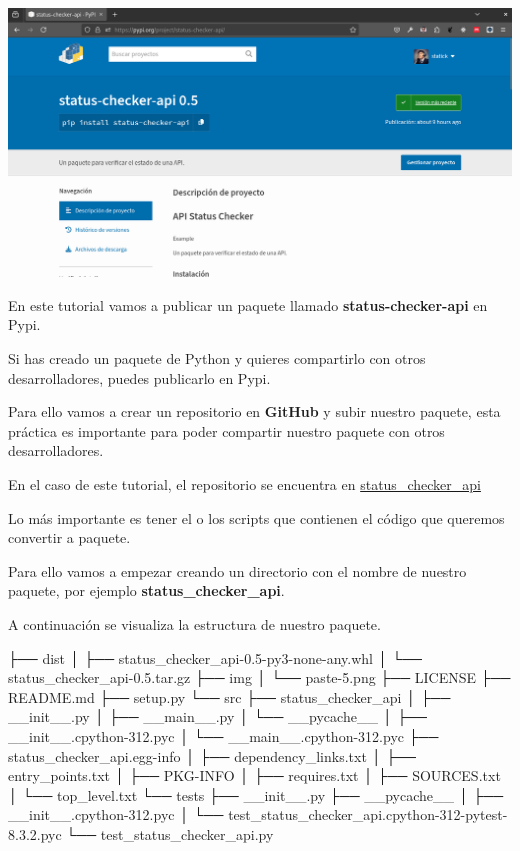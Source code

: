 \documentclass[
  a4paper,
  DIV=11,
  numbers=noendperiod,
  onepage,
  openany]{scrreprt}
\newenvironment{Shaded}{\begin{snugshade}}{\end{snugshade}}
\newcommand{\NormalTok}[1]{\textcolor[rgb]{0.00,0.23,0.31}{#1}}
\begin{document}
\begin{tcolorbox}
\includegraphics{unidades/unidad4/images/paste-10.png}

En este tutorial vamos a publicar un paquete llamado
\textbf{status-checker-api} en Pypi.

Si has creado un paquete de Python y quieres compartirlo con otros
desarrolladores, puedes publicarlo en Pypi.

Para ello vamos a crear un repositorio en \textbf{GitHub} y subir
nuestro paquete, esta práctica es importante para poder compartir
nuestro paquete con otros desarrolladores.

En el caso de este tutorial, el repositorio se encuentra en
\href{https://github.com/statick88/status_checker_api}{status\_checker\_api}

Lo más importante es tener el o los scripts que contienen el código que
queremos convertir a paquete.

Para ello vamos a empezar creando un directorio con el nombre de nuestro
paquete, por ejemplo \textbf{status\_checker\_api}.

A continuación se visualiza la estructura de nuestro paquete.

\begin{Shaded}
\begin{Highlighting}[]
\NormalTok{├── dist}
\NormalTok{│   ├── status\_checker\_api{-}0.5{-}py3{-}none{-}any.whl}
\NormalTok{│   └── status\_checker\_api{-}0.5.tar.gz}
\NormalTok{├── img}
\NormalTok{│   └── paste{-}5.png}
\NormalTok{├── LICENSE}
\NormalTok{├── README.md}
\NormalTok{├── setup.py}
\NormalTok{└── src}
\NormalTok{    ├── status\_checker\_api}
\NormalTok{    │   ├── \_\_init\_\_.py}
\NormalTok{    │   ├── \_\_main\_\_.py}
\NormalTok{    │   └── \_\_pycache\_\_}
\NormalTok{    │       ├── \_\_init\_\_.cpython{-}312.pyc}
\NormalTok{    │       └── \_\_main\_\_.cpython{-}312.pyc}
\NormalTok{    ├── status\_checker\_api.egg{-}info}
\NormalTok{    │   ├── dependency\_links.txt}
\NormalTok{    │   ├── entry\_points.txt}
\NormalTok{    │   ├── PKG{-}INFO}
\NormalTok{    │   ├── requires.txt}
\NormalTok{    │   ├── SOURCES.txt}
\NormalTok{    │   └── top\_level.txt}
\NormalTok{    └── tests}
\NormalTok{        ├── \_\_init\_\_.py}
\NormalTok{        ├── \_\_pycache\_\_}
\NormalTok{        │   ├── \_\_init\_\_.cpython{-}312.pyc}
\NormalTok{        │   └── test\_status\_checker\_api.cpython{-}312{-}pytest{-}8.3.2.pyc}
\NormalTok{        └── test\_status\_checker\_api.py}
\end{Highlighting}
\end{Shaded}


\end{tcolorbox}
\end{document}
